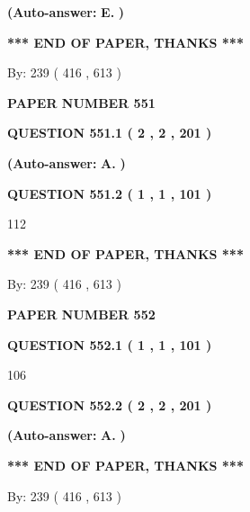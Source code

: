 \documentclass[12pt]{article}
\begin{document}
 
{\textbf{(Auto-answer:}}
{\textbf{\large{
E.}}}
{\textbf{)}}
 
 
   
   
   
   
\vspace{1.0in} 
{\textbf{\large{ *** END OF PAPER, THANKS *** }}} 
   
   
\hspace{1.0in} By: 
 239 ( 416 ,  613 )
   
   
   
   
\newpage 
\setcounter{page}{ 
   551001 } 
   
   
 {\textbf{ \Large{ PAPER NUMBER  551  }}}
   
   
   
   
  
  
{\textbf{\large{QUESTION
551.1 
 ( 2 , 2 , 201 )
}}}
 
 
{\textbf{(Auto-answer:}}
{\textbf{\large{
A.}}}
{\textbf{)}}
 
 
  
  
{\textbf{\large{QUESTION
551.2 
 ( 1 , 1 , 101 )
}}}

112
   
   
   
   
\vspace{1.0in} 
{\textbf{\large{ *** END OF PAPER, THANKS *** }}} 
   
   
\hspace{1.0in} By: 
 239 ( 416 ,  613 )
   
   
   
   
\newpage 
\setcounter{page}{ 
   552001 } 
   
   
 {\textbf{ \Large{ PAPER NUMBER  552  }}}
   
   
   
   
  
  
{\textbf{\large{QUESTION
552.1 
 ( 1 , 1 , 101 )
}}}

106
  
  
{\textbf{\large{QUESTION
552.2 
 ( 2 , 2 , 201 )
}}}
 
 
{\textbf{(Auto-answer:}}
{\textbf{\large{
A.}}}
{\textbf{)}}
 
 
   
   
   
   
\vspace{1.0in} 
{\textbf{\large{ *** END OF PAPER, THANKS *** }}} 
   
   
\hspace{1.0in} By: 
 239 ( 416 ,  613 )
   
   
   
\end{document}
